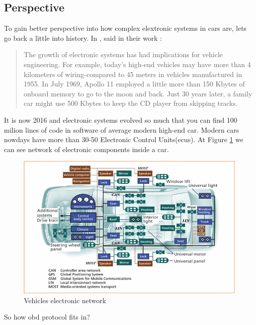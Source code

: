 \subsection{Perspective} %
\label{sub:perspective}
To gain better perspective into how complex elextronic systems in cars are, lets go back a little into history. In \citeyear{976923}, \citeauthor{976923} said in their work :
\blockquote[\cite{976923}]{The growth of electronic systems has had implications for vehicle engineering. For example, today's high-end vehicles may have more than 4 kilometers of wiring-compared to 45 meters in vehicles manufactured in 1955. In July 1969, Apollo 11 employed a little more than 150 Kbytes of onboard memory to go to the moon and back. Just 30 years later, a family car might use 500 Kbytes to keep the CD player from skipping tracks.}
It is now 2016 and electronic systems evolved so much that you can find 100 milion lines of code in software of average modern high-end car\cite{lines_of_code}. Modern cars nowdays have more than 30-50 Electronic Control Units(\glspl{ecu}). At Figure \ref{fig:car_system} we can see network of electronic components inside a car.
\begin{figure}[H]
\begin{center}
\captionsetup{font=small}
\includegraphics[scale=0.5]{pics/car_system.png}
\caption{Vehicles electronic network}
\label{fig:car_system}
\end{center}
\end{figure} So how \gls{obd} protocol fits in?
